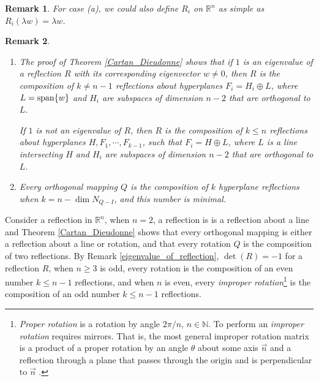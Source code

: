 \documentclass[11pt]{book}
\newtheorem{remark}{Remark}[section]
\theoremstyle{definition}
\numberwithin{equation}{chapter}
\begin{document}
\begin{subappendices}
\begin{remark}
For case (a), we could also define $R_i$ on $\mathbb{R}^n$ as simple as $R_i(\lambda w) = \lambda w$.
\end{remark}

\begin{remark}
~\begin{enumerate}[label=(\arabic*)]
    \item The proof of Theorem \ref{Cartan_Dieudonne} shows that if $1$ is an eigenvalue of a reflection $R$ with its corresponding eigenvector $w \neq 0$, then $R$ is the composition of $k \neq n - 1$ reflections about hyperplanes $F_i = H_i \oplus L$, where $L = {\rm span}\{w\}$ and $H_i$ are subspaces of dimension $n - 2$ that are orthogonal to $L$. 
    
    If $1$ is not an  eigenvalue of $R$, then $R$ is the composition of $k \leq n$ reflections about hyperplanes $H, F_1, \cdots, F_{k-1}$, such that $F_i = H \oplus L$, where $L$ is a line intersecting $H$ and  $H_i$ are subspaces of dimension $n - 2$ that are orthogonal to $L$. 
    
    \item Every orthogonal mapping $Q$ is the composition of $k$ hyperplane reflections when $k = n - \dim N_{Q-I}$, and this number is minimal. 
\end{enumerate}
\end{remark}

\medskip

Consider a reflection in $\mathbb{R}^n$, when $n = 2$, a reflection is is a reflection about a line and Theorem \ref{Cartan_Dieudonne} shows that every orthogonal mapping is either a reflection about a line or rotation, and that every rotation $Q$ is the composition of two reflections. By Remark \ref{eigenvalue_of_reflection}, $\det (R) = -1$ for a reflection $R$, when $n \geq 3$ is odd, every rotation is the composition of an even number $k \leq n - 1$ reflections, and when $n$ is even, every {\em improper rotation}\footnote{{\em Proper rotation} is a rotation by angle $2\pi/n$, $n \in \mathbb{N}$. To perform an {\em improper rotation} requires mirrors. That is, the most general improper rotation matrix is a product of a proper rotation by an angle $\theta$ about some axis $\vec{n}$ and a reflection through a plane that passes through the origin and is perpendicular to $\vec{n}$ \cite{36}.} is the composition of an odd number $k \leq n - 1$ reflections.


\end{subappendices}
\end{document}
